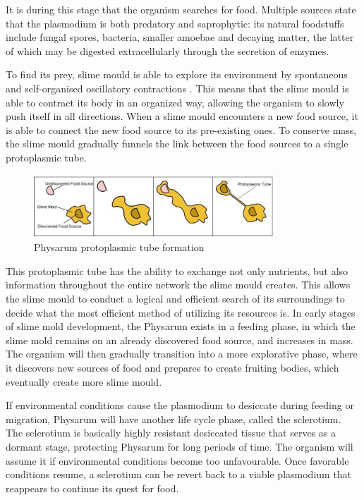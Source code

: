 \par
It is during this stage that the organism searches for food. Multiple sources state that the plasmodium is both predatory and saprophytic: its natural foodstuffs include fungal spores, bacteria, smaller amoebae and decaying matter, the latter of which may be digested extracellularly through the secretion of enzymes.

\par
To find its prey, slime mould is able to explore its environment by spontaneous and self-organised oscillatory contractions \cite{jones2015exploiting}. This means that the slime mould is able to contract its body in an organized way, allowing the organism to slowly push itself in all directions. When a slime mould encounters a new food source, it is able to connect the new food source to its pre-existing ones. To conserve mass, the slime mould gradually funnels the link between the food sources to a single protoplasmic tube.
 
\begin{figure}
  \centering
    \includegraphics[width=0.8\textwidth]{phys_tubecreation}%
    
  \caption{Physarum protoplasmic tube formation}
  \label{fig:phys_tubecreation}
\end{figure}

\par
This protoplasmic tube has the ability to exchange not only nutrients, but also information throughout the entire network the slime mould creates. This allows the slime mould to conduct a logical and efficient search of its surroundings to decide what the most efficient method of utilizing its resources is.
In early stages of slime mold development, the Physarum exists in a feeding phase, in which the slime mold remains on an already discovered food source, and increases in mass. The organism will then gradually transition into a more explorative phase, where it discovers new sources of food and prepares to create fruiting bodies, which eventually create more slime mould.

\par
If environmental conditions cause the plasmodium to desiccate during feeding or migration, Physarum will have another life cycle phase, called the sclerotium. The sclerotium is basically highly resistant desiccated tissue that serves as a dormant stage, protecting Physarum for long periods of time. The organism will assume it if environmental conditions become too
unfavourable. Once favorable conditions resume, a sclerotium can be revert back to a viable plasmodium that reappears to continue its quest for food.

